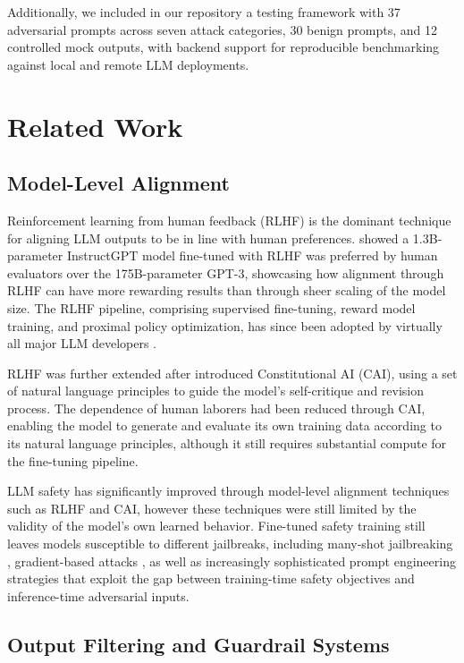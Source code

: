 \documentclass[11pt]{article}
\begin{document}
Additionally, we included in our repository a testing framework with 37 adversarial prompts
across seven attack categories, 30 benign prompts, and 12 controlled mock outputs, with backend
support for reproducible benchmarking against local and remote LLM deployments.

\section{Related Work}
\label{sec:related}

\subsection{Model-Level Alignment}
\label{sec:model-alignment}

Reinforcement learning from human feedback (RLHF) is the dominant technique for aligning LLM
outputs to be in line with human preferences. \citet{ouyang2022training} showed a 1.3B-parameter InstructGPT model fine-tuned with RLHF was preferred by human evaluators over the 175B-parameter GPT-3, showcasing
how alignment through RLHF can have more rewarding results than through sheer scaling of the
model size. The RLHF pipeline, comprising supervised fine-tuning, reward model training, and
proximal policy optimization, has since been adopted by virtually all major LLM developers \citep{touvron2023llama,bai2022training,openai2023gpt4}.

RLHF was further extended after \citet{bai2022constitutional} introduced Constitutional AI (CAI), using a set of natural
language principles to guide the model's self-critique and revision process. The dependence of
human laborers had been reduced through CAI, enabling the model to generate and evaluate its
own training data according to its natural language principles, although it still requires substantial
compute for the fine-tuning pipeline.

LLM safety has significantly improved through model-level alignment techniques such as RLHF
and CAI, however these techniques were still limited by the validity of the model's own learned
behavior. Fine-tuned safety training still leaves models susceptible to different jailbreaks, including
many-shot jailbreaking \citep{anil2024manyshot}, gradient-based attacks \citep{zou2023universal}, as well as increasingly sophisticated prompt
engineering strategies that exploit the gap between training-time safety objectives and inference-time adversarial inputs.

\subsection{Output Filtering and Guardrail Systems}
\label{sec:output-filtering}
\end{document}
